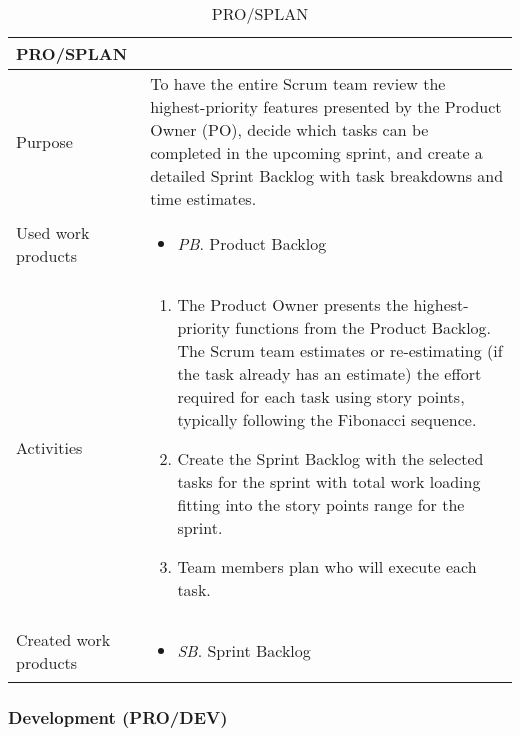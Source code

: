 \begin{table}[h!]
\begin{tabular}{l|p{}}
\hline
\textbf{PRO/SPLAN}        & \textbf{} \\ \hline
Purpose & To have the entire Scrum team review the highest-priority features presented by the Product Owner (PO), decide which tasks can be completed in the upcoming sprint, and create a detailed Sprint Backlog with task breakdowns and time estimates. \\ \hline
Used work products    &      
\begin{itemize}
    \item \textit{PB}. Product Backlog 
\end{itemize}
\\ \hline
Activities            &   
\begin{enumerate}
    \item The Product Owner presents the highest-priority functions from the Product Backlog. The Scrum team  estimates or re-estimating (if the task already has an estimate) the effort required for each task using story points, typically following the Fibonacci sequence.
    \item Create the Sprint Backlog with the selected tasks for the sprint with total work loading fitting into the story points range for the sprint.
    \item Team members plan who will execute each task.
\end{enumerate}
\\ \hline
Created work products &     
\begin{itemize}
    \item \textit{SB}. Sprint Backlog
\end{itemize}
\end{tabular}
\caption{PRO/SPLAN}
\label{PRO/SPLAN}
\end{table}


\newpage
\subsubsection{Development (PRO/DEV)}

